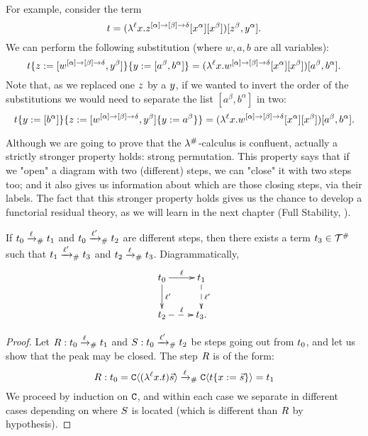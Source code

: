 \begin{example} For example, consider the term
\[
  t =
    (\lambda^{\ell} x. z^{[\alpha] \to [\beta] \to \delta} [x^\alpha] [x^\beta])
      [z^\beta,y^\alpha].
\]
We can perform the following substitution (where $w,a,b$ are all variables):
\[
  \subs{
    \subs{\tm}{\varthree}{[w^{[\alpha] \to [\beta] \to \delta}, \vartwo^\beta]}
  }{
    \vartwo
  }{
    [a^\beta,b^\alpha]
  }
  =
   (\lamp{\lab}{\var}{w^{[\alpha] \to [\beta] \to \delta} [\var^\alpha] [\var^\beta]})
    [a^\beta,b^\alpha].
\]
Note that, as we replaced one $z$ by a $y$, if we wanted to invert the order
of the substitutions we would need to separate the list $[a^\beta, b^\alpha]$ in two:
\[
  \subs{
    \subs{\tm}{\vartwo}{[b^\alpha]}
  }{
    \varthree
  }{
    \subs{[w^{[\alpha] \to [\beta] \to \delta}, \vartwo^\beta]}{\vartwo}{a^\beta}
  }
  =
   (\lamp{\lab}{\var}{w^{[\alpha] \to [\beta] \to \delta} [\var^\alpha] [\var^\beta]})
    [a^\beta,b^\alpha].
\]
\end{example}

\bigskip

Although we are going to prove that the $\lambda^{\mathtt{\#}}$-calculus is confluent,
actually a strictly stronger property holds: strong permutation.
This property says that if we "open" a diagram with two (different) steps,
we can "close" it with two steps too; and it also gives us information
about which are those closing steps, via their labels.
The fact that this stronger property holds gives us the chance to
develop a functorial residual theory,
as we will learn in the next chapter
(\cf Full Stability, ).



\begin{proposition}
If $t_0 \mathrel{\xrightarrow{\ell}_{\mathtt{\#}}} t_1$
and $t_0 \mathrel{\xrightarrow{\ell'}_{\mathtt{\#}}} t_2$
are different steps, then there exists a term $t_3 \in \mathcal{T}^{\mathtt{\#}}$ such that
$t_1 \mathrel{\xrightarrow{\ell'}_{\mathtt{\#}}} t_3$ and $t_2 \mathrel{\xrightarrow{\ell}_{\mathtt{\#}}} t_3$.
Diagrammatically,
\[
    \xymatrix{
      \tm_0 \ar@{->}[d]^{\lab'}
            \ar@{->}[r]^{\lab} &
      \tm_1 \ar@{-->}[d]^{\lab'} \\
            \ar@{-->}[r]^{\lab}
      \tm_2 &
      \tm_3. \\
    }
\]
\end{proposition}
\begin{proof}
Let $R : t_0 \mathrel{\xrightarrow{\ell}_{\mathtt{\#}}} t_1$ and $S : t_0 \mathrel{\xrightarrow{\ell'}_{\mathtt{\#}}} t_2$
be steps going out from $t_0$, and let us show that the peak may be closed.
The step $R$ is of the form:
\[
  R : t_0 = \mathtt{C}\langle(\lambda^{\ell} x. t)\vec{s}\rangle
           \mathrel{\xrightarrow{\ell}_{\mathtt{\#}}} \mathtt{C}\langle t\{x := \vec{s}\}\rangle = t_1
\]
We proceed by induction on $\mathtt{C}$, and within each case we separate in different
cases depending on where $S$ is located (which is different
than $R$ by hypothesis).
\end{proof}

